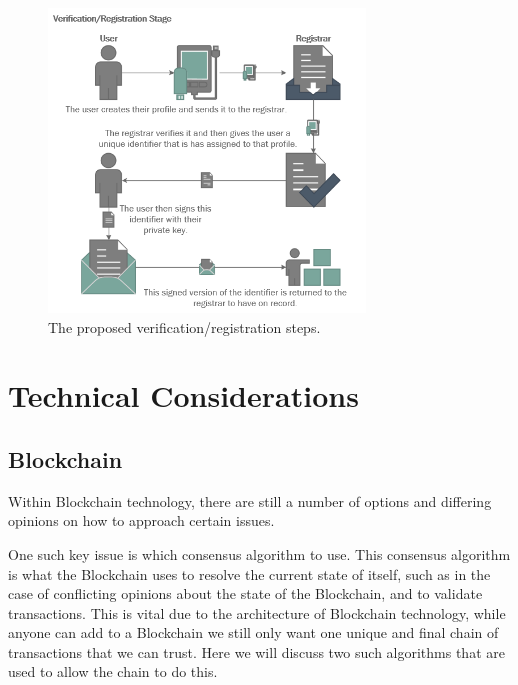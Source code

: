 \documentclass{article}
\begin{document}
\begin{figure}[h]
    \centering
    \includegraphics[width=0.75\textwidth]{verification}
    \caption{The proposed verification/registration steps.}
    \label{fig:registration}
\end{figure}

\section{Technical Considerations}

\subsection{Blockchain}

Within Blockchain technology, there are still a number of options and differing opinions on how to approach certain issues.

\par

One such key issue is which consensus algorithm to use. This consensus algorithm is what the Blockchain uses to resolve the current state of itself, such as in the case of conflicting opinions about the state of the Blockchain, and to validate transactions. This is vital due to the architecture of Blockchain technology, while anyone can add to a Blockchain we still only want one unique and final chain of transactions that we can trust. Here we will discuss two such algorithms that are used to allow the chain to do this.

\par
\end{document}
